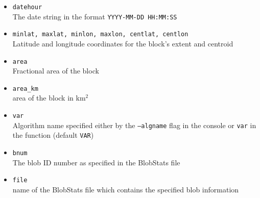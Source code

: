 \documentclass{article}
\begin{document}
\begin{itemize}
\item[]\texttt{datehour}\\The date string in the format \texttt{YYYY-MM-DD HH:MM:SS}
\item[] \texttt{minlat, maxlat, minlon, maxlon, centlat, centlon}\\ Latitude and longitude coordinates for the block's extent and centroid
\item[] \texttt{area}\\ Fractional area of the block
\item[] \texttt{area\_km}\\area of the block in km$^2$
\item[] \texttt{var}\\ Algorithm name specified either by the \texttt{--algname} flag in the console or \texttt{var} in the function (default \texttt{VAR})
\item[] \texttt{bnum} \\The blob ID number as specified in the BlobStats file
\item[] \texttt{file} \\name of the BlobStats file which contains the specified blob information
\end{itemize}
\end{document}

